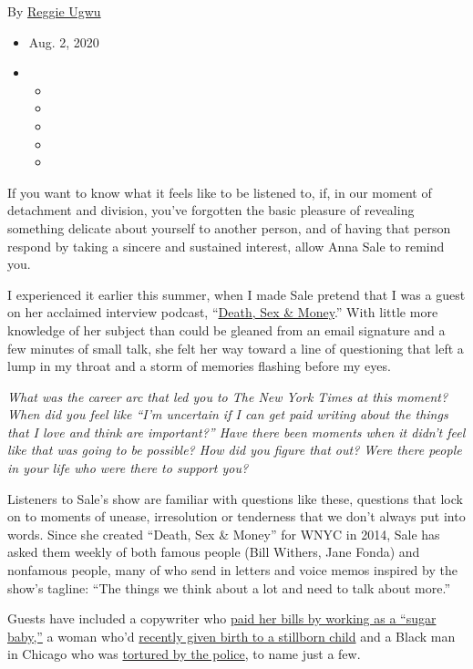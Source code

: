 By \href{https://www.nytimes3xbfgragh.onion/by/reggie-ugwu}{Reggie Ugwu}

\begin{itemize}
\item
  Aug. 2, 2020
\item
  \begin{itemize}
  \item
  \item
  \item
  \item
  \item
  \end{itemize}
\end{itemize}

If you want to know what it feels like to be listened to, if, in our
moment of detachment and division, you've forgotten the basic pleasure
of revealing something delicate about yourself to another person, and of
having that person respond by taking a sincere and sustained interest,
allow Anna Sale to remind you.

I experienced it earlier this summer, when I made Sale pretend that I
was a guest on her acclaimed interview podcast,
``\href{https://www.wnycstudios.org/podcasts/deathsexmoney}{Death, Sex
\& Money}.'' With little more knowledge of her subject than could be
gleaned from an email signature and a few minutes of small talk, she
felt her way toward a line of questioning that left a lump in my throat
and a storm of memories flashing before my eyes.

\emph{What was the career arc that led you to The New York Times at this
moment? When did you feel like ``I'm uncertain if I can get paid writing
about the things that I love and think are important?'' Have there been
moments when it didn't feel like that was going to be possible? How did
you figure that out? Were there people in your life who were there to
support you?}

Listeners to Sale's show are familiar with questions like these,
questions that lock on to moments of unease, irresolution or tenderness
that we don't always put into words. Since she created ``Death, Sex \&
Money'' for WNYC in 2014, Sale has asked them weekly of both famous
people (Bill Withers, Jane Fonda) and nonfamous people, many of who send
in letters and voice memos inspired by the show's tagline: ``The things
we think about a lot and need to talk about more.''

Guests have included a copywriter who
\href{https://www.wnycstudios.org/podcasts/deathsexmoney/episodes/seeking-arrangement-sugar-daddy-death-sex-money}{paid
her bills by working as a ``sugar baby,''} a woman who'd
\href{https://www.wnycstudios.org/podcasts/deathsexmoney/episodes/stillbirth-death-sex-money}{recently
given birth to a stillborn child} and a Black man in Chicago who was
\href{https://www.wnycstudios.org/podcasts/deathsexmoney/episodes/darrell-cannon-2020-death-sex-money}{tortured
by the police}, to name just a few.

